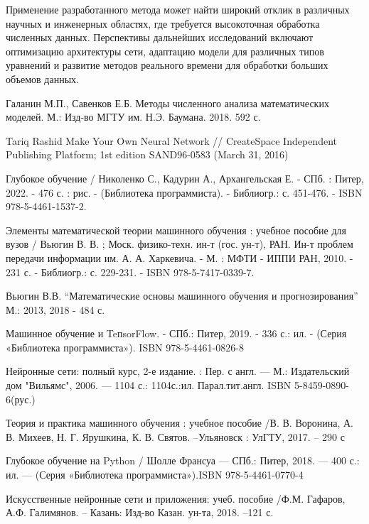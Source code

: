 \documentclass[12pt, a4paper]{article}
\begin{document}
Применение разработанного метода может найти широкий отклик в различных научных и инженерных областях, где требуется высокоточная обработка численных данных. Перспективы дальнейших исследований включают оптимизацию архитектуры сети, адаптацию модели для различных типов уравнений и развитие методов реального времени для обработки больших объемов данных.

 


\clearpage
\begin{thebibliography}{1}

 Галанин М.П., Савенков Е.Б. Методы численного анализа математических моделей. М.: Изд-во МГТУ им. Н.Э. Баумана. 2018. 592 с.


 Tariq Rashid Make Your Own Neural Network // CreateSpace Independent Publishing Platform; 1st edition SAND96-0583 (March 31, 2016)


 Глубокое обучение / Николенко С., Кадурин А., Архангельская Е. - СПб. : Питер, 2022. - 476 с. : рис. - (Библиотека программиста). - Библиогр.: с. 451-476. - ISBN 978-5-4461-1537-2.


 Элементы математической теории машинного обучения : учебное пособие для вузов / Вьюгин В. В. ; Моск. физико-техн. ин-т (гос. ун-т), РАН. Ин-т проблем передачи информации им. А. А. Харкевича. - М. : МФТИ - ИППИ РАН, 2010. - 231 с. - Библиогр.: с. 229-231. - ISBN 978-5-7417-0339-7.


 Вьюгин В.В. “Математические основы машинного обучения и прогнозирования” М.: 2013, 2018 - 484 с.


 Машинное обучение и TeпsorFlow. - СПб.: Питер, 2019. - 336 с.: ил. - (Серия «Библиотека программиста»). ISBN 978-5-4461-0826-8


 Нейронные сети: полный курс, 2-е издание. : Пер. с англ. --- М.: Издательский дом "Вильямс", 2006. --- 1104 с.: 1104с.:ил. Парал.тит.англ. ISBN 5-8459-0890-6(рус.)


 Теория и практика машинного обучения : учебное пособие /В. В. Воронина, А. В. Михеев, Н. Г. Ярушкина, К. В. Святов. –Ульяновск : УлГТУ, 2017. – 290 с


 Глубокое обучение на Python / Шолле Франсуа — СПб.: Питер, 2018. — 400 с.: ил. — (Серия «Библиотека программиста»).ISBN 978-5-4461-0770-4

 Искусственные нейронные сети и приложения: учеб. пособие /Ф.М. Гафаров, А.Ф. Галимянов. – Казань: Изд-во Казан. ун-та, 2018. –121 с.




\end{thebibliography}
\end{document}
